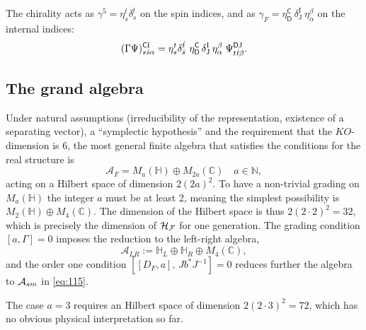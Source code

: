 \documentclass[11pt]{article}
\newcommand{\dotspinind}[1]{\mathit{\dot #1}}
\newcommand{\colorind}[1]{{\mathrm{#1}}}
\newcommand{\flavind}[1]{{\mathbf #1}}
\newcommand{\partind}[1]{{\sf #1}}
\newcommand{\sI}{\mathrm  I}
\newcommand{\sJ}{\mathrm J}
\newcommand{\sC}{\mathsf C}
\newcommand{\sD}{\mathsf D}
\begin{document}
The chirality acts as $\gamma^5 = \eta_s^t \delta_{\dot s}^{\dot t}$
on the spin indices, and as $\gamma_F = \eta^\sC_\sD\,\delta^\sI_\sJ\,\eta_\alpha^\beta $  on the internal indices:
\begin{equation}
\label{tensorJgamma}
(\Gamma\Psi)^{\partind C\colorind I}_{s\dotspinind s
  \flavind{\alpha}} = \eta_s^t \delta_{\dot s}^{\dot
t}\, \,\eta^\sC_\sD\,\delta^\sI_\sJ\,\eta_\alpha^\beta \; \Psi^{\partind D\colorind J}_{t\dotspinind t
  \flavind{\beta}}.
\end{equation}
\subsection{The grand algebra\label{se:tripleforsm}}


Under natural assumptions (irreducibility of the representation,
existence of a separating vector), a ``symplectic hypothesis'' and the requirement that the $KO$-dimension is $6$,
the most general finite algebra that satisfies the conditions for the
real structure is \cite{Chamseddine:2008uq}
\begin{equation}
\mathcal{\mathcal{A}}_F=M_{a}(\mathbb{H})\oplus M_{2a}(\mathbb{C})
\quad a\in\mathbb{N},
 \label{genericalgebra}
\end{equation}
acting on a Hilbert space of dimension $2(2a)^2$. To have a non-trivial grading on $M_{a}(\mathbb{H})$ the integer 
$a$ must be at least 2, meaning the simplest possibility is 
$
M_{2}(\mathbb{H})\oplus M_{4}(\mathbb{C}). 
\label{bigalgebra}
$
The dimension of the Hilbert space is thus $2(2\cdot2)^2 = 32$, which
is precisely the dimension of $\cal H_F$ for one generation. The grading condition $[a,\Gamma]=0$ imposes the reduction to 
the left-right algebra,
\begin{equation}
\mathcal{A}_{LR}:=\mathbb{H}_L\oplus\mathbb{H}_R\oplus M_{4}(\mathbb{C}),
 \label{repa2}
\end{equation}
and the
order one condition $[[D_F, a], \, Jb^*J^{-1}]=0$ reduces further the algebra to 
${\cal A}_{sm}$ in \eqref{eq:115}.

The case $a=3$ requires an Hilbert space of dimension
$2(2\cdot3)^2= 72$, which has no obvious physical interpretation so
far. 
\end{document}
